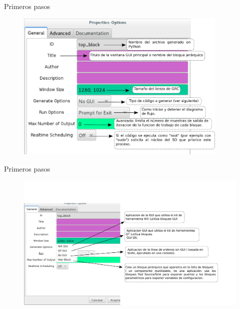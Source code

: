 \begin{frame}{Primeros pasos}
\begin{figure}[H]
\vspace{-3mm}
\centering
\includegraphics[width=0.9\textwidth]{lab1/pdf/lab1_4.pdf}
\end{figure}
\end{frame}

\begin{frame}{Primeros pasos}
\begin{figure}[H]
\vspace{-2cm}
\centering
\includegraphics[width=1.1\textwidth]{lab1/pdf/lab1_5.pdf}
\end{figure}
\end{frame}

